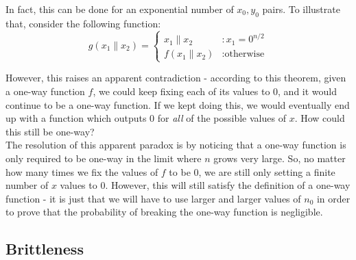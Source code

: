 
In fact, this can be done for an exponential number of $x_0, y_0$ pairs. To illustrate that, consider the following function:
\[
  g(x_1\|x_2) = \left\{ \begin{array}{ll} x_1\|x_2 & : x_1 = 0^{n/2} \\ f(x_1\|x_2) & : \text{otherwise} \end{array} \right.
\]

However, this raises an apparent contradiction - according to this theorem, given a one-way function $f$, we could keep fixing each of its values to $0$, and it would continue to be a one-way function.  If we kept doing this, we would eventually end up with a function which outputs 0 for {\em all} of the possible values of $x$.  How could this still be one-way?\\

The resolution of this apparent paradox is by noticing that a one-way function is only required to be one-way in the limit where $n$ grows very large.  So, no matter how many times we fix the values of $f$ to be 0, we are still only setting a finite number of $x$ values to 0.  However, this will still satisfy the definition of a one-way function - it is just that we will have to use larger and larger values of $n_0$ in order to prove that the probability of breaking the one-way function is negligible.

\subsection{Brittleness}
